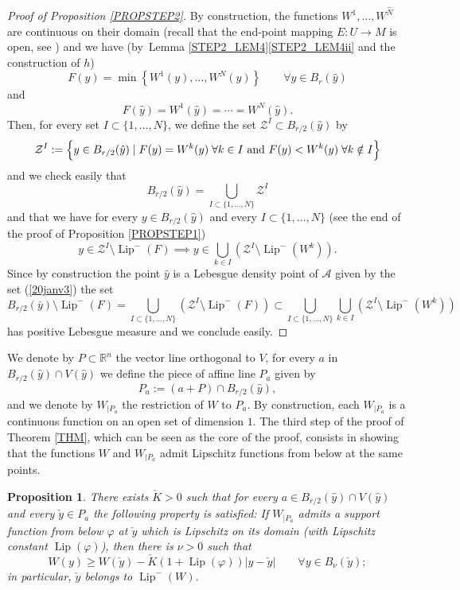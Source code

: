 \documentclass[JEP,XML,SOM,Unicode,NoFloatCountersInSection,published]{cedram}
\let\sep\mid
\DeclareMathOperator{\Lip}{Lip}
\newcommand\R{\mathbb R}
\newtheorem{proposition}[theorem]{Proposition}
\theoremstyle{definition}
\begin{document}
\begin{proof}[Proof of Proposition \ref{PROPSTEP2}]
\noindent
By construction, the functions $W^1, \ldots, W^{\hat{N}}$ are continuous on their domain (recall that the end-point mapping $E:U \to M$ is open, see \eg \cite[\S 1.4]{riffordbook}) and we have (by~Lem\-ma \ref{STEP2_LEM4}\eqref{STEP2_LEM4ii} and the construction of $h$)
\[
F(y) = \min \left\{W^1(y), \ldots, W^{N}(y)\right\} \qquad \forall y \in B_r(\hat{y})
\]
and
\[
F(\hat{y}) = W^1(\hat{y}) = \cdots = W^{N}(\hat{y}).
\]
Then, for every set $I\subset \{1, \ldots, N\}$, we define the set $\mathcal{Z}^{I}\subset B_{r/2}(\hat{y})$ by
\[
\mathcal{Z}^{I} := \Bigl\{ y \in B_{r/2}(\hat{y}) \sep  F(y)=W^k(y) \; \forall k \in I \text{ and } F(y)<W^k(y) \; \forall k \notin I \Bigr\}
\]
and we check easily that
\[
B_{r/2}(\hat{y}) = \bigcup_{I\subset \{1,\ldots,N\}} \mathcal{Z}^{I}
\]
and that we have for every $y\in B_{r/2}(\hat{y})$ and every $I\subset \{1,\ldots,N\}$ (see the end of the proof of Proposition \ref{PROPSTEP1})
\[
y \in \mathcal{Z}^{I} \setminus \Lip^-(F) \implies y \in \bigcup_{k\in I} \left(\mathcal{Z}^{I} \setminus \Lip^-(W^k)\right).
\]
Since by construction the point $\hat{y}$ is a Lebesgue density point of $\mathcal{A}$ given by the set (\ref{20janv3}) the set
\[
B_{r/2} (\bar{y}) \setminus \Lip^-(F) = \bigcup_{I\subset \{1,\ldots,N\}} \left(\mathcal{Z}^{I} \setminus \Lip^-(F) \right) \subset \bigcup_{I\subset \{1,\ldots,N\}} \bigcup_{k\in I} \left(\mathcal{Z}^{I} \setminus \Lip^-(W^k)\right)
\]
has positive Lebesgue measure and we conclude easily.
\end{proof}

We denote by $P\subset \R^n$ the vector line orthogonal to $V$, for every $a$ in $B_{r/2}(\hat{y})\cap V(\hat{y})$ we define the piece of affine line $P_a$ given by
\[
P_a := (a+P) \cap B_{r/2}(\hat{y}),
\]
and we denote by $W_{|P_a}$ the restriction of $W$ to $P_a$. By construction, each $W_{|P_a}$ is a continuous function on an open set of dimension $1$. The third step of the proof of Theorem \ref{THM}, which can be seen as the core of the proof, consists in showing that the functions $W$ and $W_{|P_a}$ admit Lipschitz functions from below at the same points.

\begin{proposition}\label{PROPSTEP3}
There exists $\check{K}>0$ such that for every $a\in B_{r/2}(\hat{y})\cap V(\hat{y})$ and every $\check{y} \in P_a$ the following property is satisfied: If $W_{|P_a}$ admits a support function from below $\varphi$ at $\check{y}$ which is Lipschitz on its domain (with Lipschitz constant $\Lip(\varphi)$), then there is $\nu>0$ such that
\[
W(y) \geq W(\check{y}) - \check{K} \left(1+\Lip(\varphi)\right) \left|y-\check{y}\right| \qquad \forall y \in B_{\nu}(\check{y});
\]
in particular, $\check{y}$ belongs to $\Lip^-(W)$.
\end{proposition}
\end{document}
